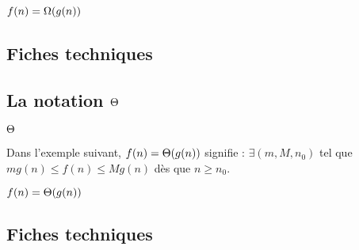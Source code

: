 \documentclass[12pt,a4paper]{article}
\begin{document}
\begin{latexex}
$f(n) = \operatorname{\bm{\Omega}}(g(n))$
\end{latexex}




\subsection{Fiches techniques}





\subsection{\texorpdfstring{La notation $\operatorname{\bm{\Theta}}$}%
                           {La notation "grand Theta"}}

\newparaexample{}

\begin{latexex}
$\operatorname{\bm{\Theta}}$
\end{latexex}




\newparaexample{}

Dans l'exemple suivant, $f(n) = \operatorname{\bm{\Theta}}(g(n))$ signifie : $\exists (m, M, n_0)$ tel que $m g(n) \leq f(n) \leq M g(n)$ dès que $n \geq n_0$.

\begin{latexex}
$f(n) = \operatorname{\bm{\Theta}}(g(n))$
\end{latexex}




\subsection{Fiches techniques}

\end{document}
